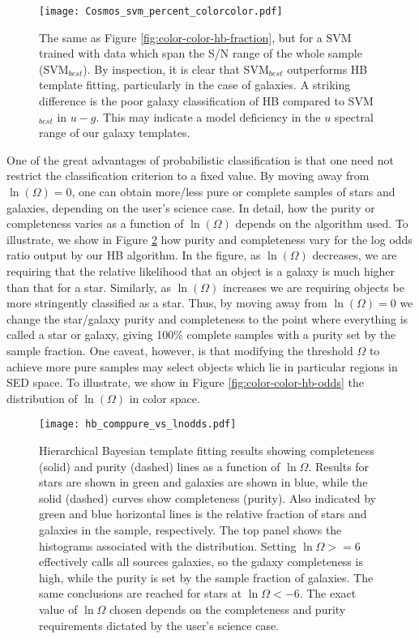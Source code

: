 \documentclass[12pt,preprint]{aastex}
\begin{document}
\begin{figure}
\centering
\texttt{[image: Cosmos\_svm\_percent\_colorcolor.pdf]}
\caption{The same as Figure \ref{fig:color-color-hb-fraction}, but for a SVM trained with data which span 
the S/N range of the whole sample (SVM$_{best}$). By inspection, it is clear that SVM$_{best}$ outperforms 
HB template fitting, particularly in the case of galaxies.  A striking difference is the poor galaxy classification 
of HB compared to SVM$_{best}$ in $u-g$.  This may indicate a model deficiency in the $u$ spectral range 
of our galaxy templates.}
\label{fig:color-color-svm-fraction}
\end{figure}


One of the great advantages of probabilistic classification is that one need not restrict the classification 
criterion to a fixed value.  By moving away from $\ln(\Omega)=0$, one can obtain more/less pure or 
complete samples of stars and galaxies, depending on the user's science case.  In detail, how the purity 
or completeness varies as a function of $\ln(\Omega)$ depends on the algorithm used.  To illustrate, we 
show in Figure \ref{fig:hb-logodds} how purity and completeness vary for the log odds ratio output by 
our HB algorithm.  In the figure, as $\ln(\Omega)$ decreases, we are requiring that the relative likelihood 
that an object is a galaxy is much higher than that for a star.  Similarly, as $\ln(\Omega)$ increases we are 
requiring objects be more stringently classified as a star.  Thus, by moving away from $\ln(\Omega)=0$ 
we change the star/galaxy purity and completeness to the point where everything is called a star or galaxy, 
giving 100\% complete samples with a purity set by the sample fraction.  One caveat, however, is that 
modifying the threshold $\Omega$ to achieve more pure samples may select objects which lie in particular 
regions in SED space.  To illustrate, we show in Figure \ref{fig:color-color-hb-odds} the distribution of 
$\ln(\Omega)$ in color space.   

\begin{figure}
\centering
\texttt{[image: hb\_comppure\_vs\_lnodds.pdf]}
\caption{Hierarchical Bayesian template fitting results showing completeness (solid) and purity (dashed) lines 
as a function of $\ln\Omega$.  Results for stars are shown in green and galaxies are 
shown in blue, while the solid (dashed) curves show completeness (purity).  Also indicated by green and 
blue horizontal lines is the relative fraction of stars and galaxies in the sample, respectively.  The top panel 
shows the histograms associated with the distribution. Setting $\ln\Omega>=6$ effectively 
calls all sources galaxies, so the galaxy completeness is high, while the purity is set by the sample 
fraction of galaxies.  The same conclusions are reached for stars at $\ln\Omega<-6$.  The 
exact value of $\ln\Omega$ chosen depends on the completeness and purity requirements 
dictated by the user's science case.}
\label{fig:hb-logodds}
\end{figure}
\end{document}
